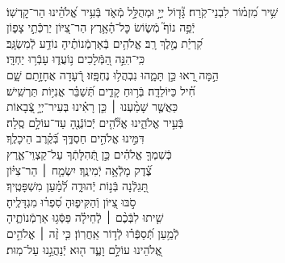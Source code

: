 \documentclass[twoside, openany, parskip=half, 11pt]{book}
\begin{document}
\\
\vspace{-1.5\baselineskip}
%
\begin{narrow}
שִׁ֥יר מִ֝זְמ֗וֹר לִבְנֵי־קֹֽרַח׃ \hfill \break
גָּ֘ד֤וֹל יְיָ֣ וּמְהֻלָּ֣ל מְֿאֹ֑ד \hfill בְּֿעִ֥יר אֱ֝לֹהֵ֗ינוּ הַר־קׇדְשֽׁוֹ׃ \\
יְֿפֵ֥ה נוֹף֮ מְֿשׂ֢וֹשׂ כׇּל־הָ֫אָ֥רֶץ \hfill הַר־צִ֭יּוֹן יַרְכְּֿֿתֵ֣י צָפ֑וֹן \\ קִ֝רְיַ֗ת מֶ֣לֶךְ רָֽב׃ \hfill
אֱלֹהִ֥ים בְּֿאַרְמְֿנוֹתֶ֗יהָ נוֹדַ֥ע לְֿמִשְׂגָּֽב׃ \\
כִּֽי־הִנֵּ֣ה הַ֭מְּֿלָכִים נ֥וֹעֲד֑וּ \hfill עָבְֿר֥וּ יַחְדָּֽו׃ \\
הֵ֣מָּה רָ֭אוּ כֵּ֣ן תָּמָ֑הוּ נִבְהֲל֥וּ נֶחְפָּֽזוּ׃ \hfill
רְֿ֭עָדָה אֲחָזָ֣תַם שָׁ֑ם \\ חִ֗֝יל כַּיּוֹלֵדָֽה׃ \hfill
בְּֿר֥וּחַ קָדִ֑ים תְּֿ֝שַׁבֵּ֗ר אֳנִיּ֥וֹת תַּרְשִֽׁישׁ׃ \\
כַּאֲשֶׁ֤ר שָׁמַ֨עְנוּ ׀ כֵּ֤ן רָאִ֗ינוּ \hfill בְּעִיר־יְיָ֣ צְֿ֭בָאוֹת \\ בְּֿעִ֣יר אֱלֹהֵ֑ינוּ \hfill אֱלֹ֘הִ֤ים יְֿכוֹנְֿנֶ֖הָ עַד־עוֹלָ֣ם סֶֽלָה׃ \\
דִּמִּ֣ינוּ אֱלֹהִ֣ים חַסְדֶּ֑ךָ \hfill בְּֿ֝קֶ֗רֶב הֵיכָלֶֽךָ׃ \\
כְּֿשִׁמְךָ֤ אֱלֹהִ֗ים \hfill כֵּ֣ן תְּֿ֭הִלָּתְֿךָ עַל־קַצְוֵי־אֶ֑רֶץ \\ צֶ֗֝דֶק מָלְֿאָ֥ה יְֿמִינֶֽךָ׃ \hfill
יִשְׂמַ֤ח ׀ הַר־צִיּ֗וֹן \\ תָּ֭גֵלְֿנָה בְּֿנ֣וֹת יְֿהוּדָ֑ה \hfill לְֿ֝מַ֗עַן מִשְׁפָּטֶֽיךָ׃ \\
סֹ֣בּוּ צִ֭יּוֹן וְֿהַקִּיפ֑וּהָ \hfill סִ֝פְר֗וּ מִגְדָּלֶֽיהָ׃ \\
שִׁ֤יתוּ לִבְּֿכֶ֨ם ׀ לְֽֿחֵילָ֗ה \hfill פַּסְּֿג֥וּ אַרְמְֿנוֹתֶ֑יהָ \\ לְֿמַ֥עַן תְּֿ֝סַפְּֿר֗וּ לְֿד֣וֹר אַֽחֲרֽוֹן׃ \hfill
כִּ֤י זֶ֨ה ׀ אֱלֹהִ֣ים \\ אֱ֭לֹהֵינוּ עוֹלָ֣ם \hfill וָעֶ֑ד ה֖וּא יְֿנַהֲגֵ֣נוּ עַל־מֽוּת׃
\end{narrow}

\enlargethispage{\baselineskip}
\end{document}
